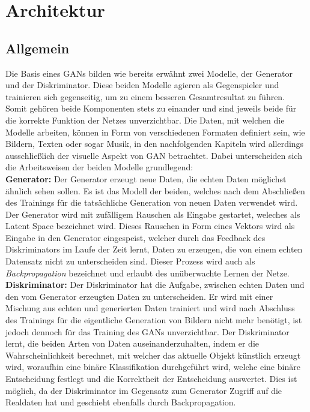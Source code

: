 \section{Architektur}

\subsection{Allgemein}

\noindent Die Basis eines \acp{GAN} bilden wie bereits erwähnt zwei Modelle, der Generator und der Diskriminator. Diese beiden Modelle agieren als Gegenspieler und trainieren sich gegenseitig, um zu einem besseren Gesamtresultat zu führen. Somit gehören beide Komponenten stets zu einander und sind jeweils beide für die korrekte Funktion der Netzes unverzichtbar. Die Daten, mit welchen die Modelle arbeiten, können in Form von verschiedenen Formaten definiert sein, wie Bildern, Texten oder sogar Musik, in den nachfolgenden Kapiteln wird allerdings ausschließlich der visuelle Aspekt von \acs{GAN} betrachtet. Dabei unterscheiden sich die Arbeitsweisen der beiden Modelle grundlegend: \\

\noindent \textbf{Generator:} Der Generator erzeugt neue Daten, die echten Daten möglichst ähnlich sehen sollen. Es ist das Modell der beiden, welches nach dem Abschließen des Trainings für die tatsächliche Generation von neuen Daten verwendet wird. Der Generator wird mit zufälligem Rauschen als Eingabe gestartet, weleches als Latent Space bezeichnet wird. Dieses Rauschen in Form eines Vektors wird als Eingabe in den Generator eingespeist, welcher durch das Feedback des Diskriminators im Laufe der Zeit lernt, Daten zu erzeugen, die von einem echten Datensatz nicht zu unterscheiden sind. Dieser Prozess wird auch als \textit{Backpropagation} bezeichnet und erlaubt des unüberwachte Lernen der Netze. \\

\noindent \textbf{Diskriminator:} Der Diskriminator hat die Aufgabe, zwischen echten Daten und den vom Generator erzeugten Daten zu unterscheiden. Er wird mit einer Mischung aus echten und generierten Daten trainiert und wird nach Abschluss des Trainings für die eigentliche Generation von Bildern nicht mehr benötigt, ist jedoch dennoch für das Training des \acp{GAN} unverzichtbar. Der Diskriminator lernt, die beiden Arten von Daten auseinanderzuhalten, indem er die Wahrscheinlichkeit berechnet, mit welcher das aktuelle Objekt künstlich erzeugt wird, woraufhin eine binäre Klassifikation durchgeführt wird, welche eine binäre Entscheidung festlegt und die Korrektheit der Entscheidung auswertet. Dies ist möglich, da der Diskriminator im Gegensatz zum Generator Zugriff auf die Realdaten hat und geschieht ebenfalls durch Backpropagation. \\

